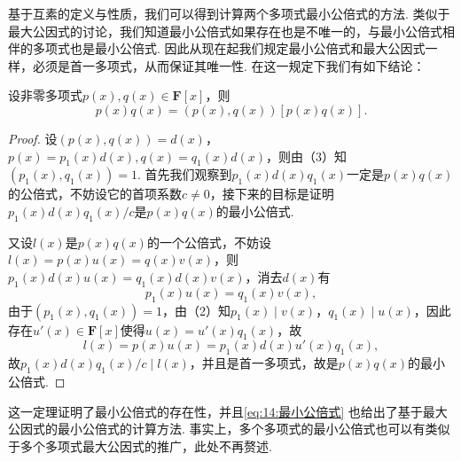 基于互素的定义与性质，我们可以得到计算两个多项式最小公倍式的方法. 类似于最大公因式的讨论，我们知道最小公倍式如果存在也是不唯一的，与最小公倍式相伴的多项式也是最小公倍式. 因此从现在起我们规定最小公倍式和最大公因式一样，必须是首一多项式，从而保证其唯一性. 在这一规定下我们有如下结论：
\begin{theorem}{}{}
    设非零多项式$p(x),q(x)\in\mathbf{F}[x]$，则
    \begin{equation} \label{eq:14:最小公倍式}
        p(x)q(x)=(p(x),q(x))[p(x)q(x)].
    \end{equation}
\end{theorem}
\begin{proof}
    设$(p(x),q(x))=d(x)$，$p(x)=p_1(x)d(x),q(x)=q_1(x)d(x)$，则由（3）知$(p_1(x),q_1(x))=1$. 首先我们观察到$p_1(x)d(x)q_1(x)$一定是$p(x)q(x)$的公倍式，不妨设它的首项系数$c\neq 0$，接下来的目标是证明$p_1(x)d(x)q_1(x)/c$是$p(x)q(x)$的最小公倍式.

    又设$l(x)$是$p(x)q(x)$的一个公倍式，不妨设$l(x)=p(x)u(x)=q(x)v(x)$，则$p_1(x)d(x)u(x)=q_1(x)d(x)v(x)$，消去$d(x)$有
    \[p_1(x)u(x)=q_1(x)v(x),\]
    由于$(p_1(x),q_1(x))=1$，由（2）知$p_1(x)\mid v(x)$，$q_1(x)\mid u(x)$，因此存在$u'(x)\in\mathbf{F}[x]$使得$u(x)=u'(x)q_1(x)$，故
    \[l(x)=p(x)u(x)=p_1(x)d(x)u'(x)q_1(x),\]
    故$p_1(x)d(x)q_1(x)/c\mid l(x)$，并且是首一多项式，故是$p(x)q(x)$的最小公倍式.
\end{proof}

这一定理证明了最小公倍式的存在性，并且\autoref{eq:14:最小公倍式} 也给出了基于最大公因式的最小公倍式的计算方法. 事实上，多个多项式的最小公倍式也可以有类似于多个多项式最大公因式的推广，此处不再赘述.

